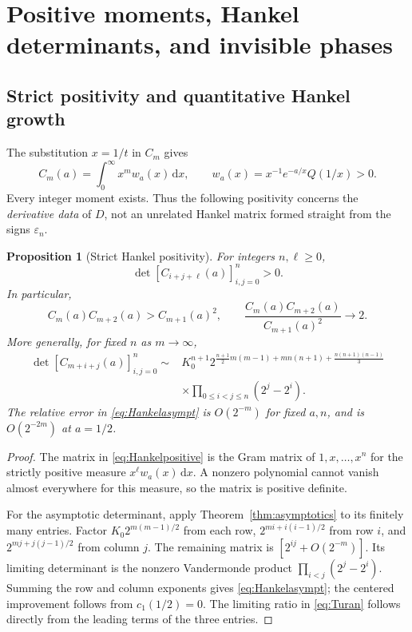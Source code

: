 \documentclass[11pt,letterpaper]{article}
\numberwithin{equation}{section}
\newtheorem{proposition}[theorem]{Proposition}
\theoremstyle{definition}
\theoremstyle{remark}
\newcommand{\dd}{\,\mathrm d}
\newcommand{\eps}{\varepsilon}
\begin{document}
\section{Positive moments, Hankel determinants, and invisible phases}\label{sec:moments}

\subsection{Strict positivity and quantitative Hankel growth}
The substitution $x=1/t$ in $C_m$ gives
\begin{equation}\label{eq:Cmoment}
 C_m(a)=\int_0^\infty x^m w_a(x)\dd x,
 \qquad w_a(x)=x^{-1}e^{-a/x}Q(1/x)>0.
\end{equation}
Every integer moment exists. Thus the following positivity concerns the
\emph{derivative data} of $D$, not an unrelated Hankel matrix formed
straight from the signs $\eps_n$.

\begin{proposition}[Strict Hankel positivity]\label{prop:Hankel}
For integers $n,\ell\ge0$,
\begin{equation}\label{eq:Hankelpositive}
 \det[C_{i+j+\ell}(a)]_{i,j=0}^n>0.
\end{equation}
In particular,
\begin{equation}\label{eq:Turan}
 C_m(a)C_{m+2}(a)>C_{m+1}(a)^2,
 \qquad
 \frac{C_m(a)C_{m+2}(a)}{C_{m+1}(a)^2}\longrightarrow2.
\end{equation}
More generally, for fixed $n$ as $m\to\infty$,
\begin{equation}\label{eq:Hankelasympt}
 \begin{split}
 \det[C_{m+i+j}(a)]_{i,j=0}^n\sim{}&K_0^{n+1}
 2^{\frac{n+1}{2}m(m-1)+mn(n+1)+\frac{n(n+1)(n-1)}3}\\
 &\times\prod_{0\le i<j\le n}(2^j-2^i).
 \end{split}
\end{equation}
The relative error in \eqref{eq:Hankelasympt} is $O(2^{-m})$ for fixed
$a,n$, and is $O(2^{-2m})$ at $a=1/2$.
\end{proposition}
\begin{proof}
The matrix in \eqref{eq:Hankelpositive} is the Gram matrix of
$1,x,\ldots,x^n$ for the strictly positive measure $x^\ell w_a(x)\dd x$.
A nonzero polynomial cannot vanish almost everywhere for this measure, so
the matrix is positive definite.

For the asymptotic determinant, apply Theorem~\ref{thm:asymptotics} to its
finitely many entries. Factor $K_0 2^{m(m-1)/2}$ from each row,
$2^{mi+i(i-1)/2}$ from row $i$, and
$2^{mj+j(j-1)/2}$ from column $j$.
The remaining matrix is $[2^{ij}+O(2^{-m})]$.
Its limiting determinant is the nonzero Vandermonde product
$\prod_{i<j}(2^j-2^i)$. Summing the row and column exponents gives
\eqref{eq:Hankelasympt}; the centered improvement follows from $c_1(1/2)=0$.
The limiting ratio in \eqref{eq:Turan} follows directly from the leading
terms of the three entries.
\end{proof}
\end{document}
